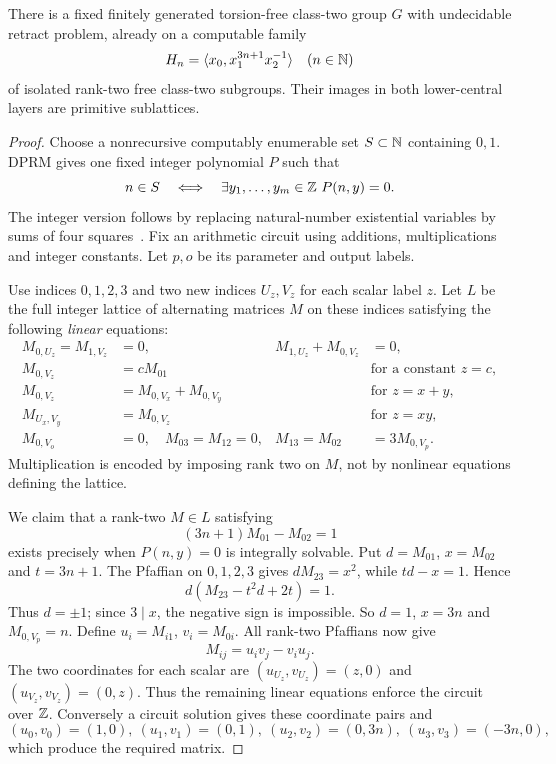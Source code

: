 \begin{theorem}\label{prop:n9}
There is a fixed finitely generated torsion-free class-two group $G$
with undecidable retract problem, already on a computable family
\[
 H_n=\langle x_0,x_1^{3n+1}x_2^{-1}\rangle\quad(n\in\mathbb N)
\]
of isolated rank-two free class-two subgroups. Their images in both
lower-central layers are primitive sublattices.
\end{theorem}
\begin{proof}
Choose a nonrecursive computably enumerable set $S\subset\mathbb N$ containing
$0,1$. DPRM gives one fixed integer polynomial $P$ such that
\[
 n\in S\quad\Longleftrightarrow\quad
 \exists y_1,\ldots,y_m\in\mathbb Z\ P(n,y)=0.
\]
The integer version follows by replacing natural-number existential
variables by sums of four squares~\cite{dprm-coq}. Fix an arithmetic
circuit using additions, multiplications and integer constants. Let
$p,o$ be its parameter and output labels.

Use indices $0,1,2,3$ and two new indices $U_z,V_z$ for each scalar
label $z$. Let $L$ be the full integer lattice of alternating matrices
$M$ on these indices satisfying the following \emph{linear} equations:
\begin{align*}
 M_{0,U_z}=M_{1,V_z}&=0,&M_{1,U_z}+M_{0,V_z}&=0,\\
 M_{0,V_z}&=cM_{01}&&\text{for a constant }z=c,\\
 M_{0,V_z}&=M_{0,V_x}+M_{0,V_y}&&\text{for }z=x+y,\\
 M_{U_x,V_y}&=M_{0,V_z}&&\text{for }z=xy,\\
 M_{0,V_o}&=0,\quad M_{03}=M_{12}=0,&
 M_{13}=M_{02}&=3M_{0,V_p}.
\end{align*}
Multiplication is encoded by imposing rank two on $M$, not by nonlinear
equations defining the lattice.

We claim that a rank-two $M\in L$ satisfying
\begin{equation}\label{eq:n9-unit}
 (3n+1)M_{01}-M_{02}=1
\end{equation}
exists precisely when $P(n,y)=0$ is integrally solvable. Put
$d=M_{01}$, $x=M_{02}$ and $t=3n+1$. The Pfaffian on $0,1,2,3$
gives $dM_{23}=x^2$, while $td-x=1$. Hence
\[
 d(M_{23}-t^2d+2t)=1.
\]
Thus $d=\pm1$; since $3\mid x$, the negative sign is impossible.
So $d=1$, $x=3n$ and $M_{0,V_p}=n$. Define
$u_i=M_{i1}$, $v_i=M_{0i}$. All rank-two Pfaffians now give
\[
 M_{ij}=u_iv_j-v_iu_j.
\]
The two coordinates for each scalar are $(u_{U_z},v_{U_z})=(z,0)$
and $(u_{V_z},v_{V_z})=(0,z)$. Thus the remaining linear equations
enforce the circuit over $\mathbb Z$. Conversely a circuit solution gives
these coordinate pairs and
\[
 (u_0,v_0)=(1,0),\ (u_1,v_1)=(0,1),\
 (u_2,v_2)=(0,3n),\ (u_3,v_3)=(-3n,0),
\]
which produce the required matrix.


\end{proof}

